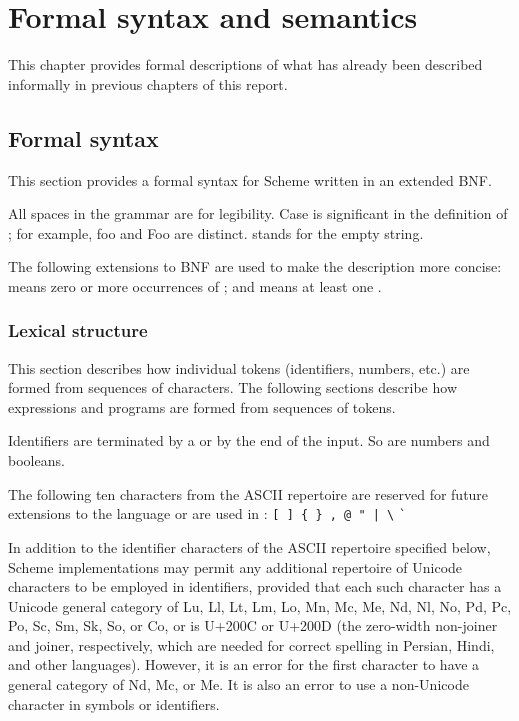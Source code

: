 \chapter{Formal syntax and semantics}
\label{formalchapter}

This chapter provides formal descriptions of what has already been
described informally in previous chapters of this report.

\section{Formal syntax}
\label{BNF}

This section provides a formal syntax for Scheme written in an extended
BNF.

All spaces in the grammar are for legibility.  Case is significant
in the definition of ; for example,  {\cf foo} and {\cf Foo}
are distinct.
 stands for the empty string.

The following extensions to BNF are used to make the description more
concise:   means zero or more occurrences of
; and  means at least one
.

\subsection{Lexical structure}

This section describes how individual tokens (identifiers,
numbers, etc.) are formed from sequences of characters.  The following
sections describe how expressions and programs are formed from sequences
of tokens.

\vest Identifiers are
terminated by a  or by the end of the input.
So are numbers and booleans.

The following ten characters from the ASCII repertoire
are reserved for future extensions to the
language or are used in \rsevenrs:
{\tt \verb"[" \verb"]" \verb"{" \verb"}" \verb',' \verb'@'
\verb'"' \verb'|' \verb'\'} \verb"`"

In addition to the identifier characters of the ASCII repertoire specified
below, Scheme implementations may permit any additional repertoire of
Unicode characters to be employed in identifiers,
provided that each such character has a Unicode general category of Lu,
Ll, Lt, Lm, Lo, Mn, Mc, Me, Nd, Nl, No, Pd, Pc, Po, Sc, Sm, Sk, So,
or Co, or is U+200C or U+200D (the zero-width non-joiner and joiner,
respectively, which are needed for correct spelling in Persian, Hindi,
and other languages).
However, it is an error for the first character to have a general category
of Nd, Mc, or Me.  It is also an error to use a non-Unicode character
in symbols or identifiers.

